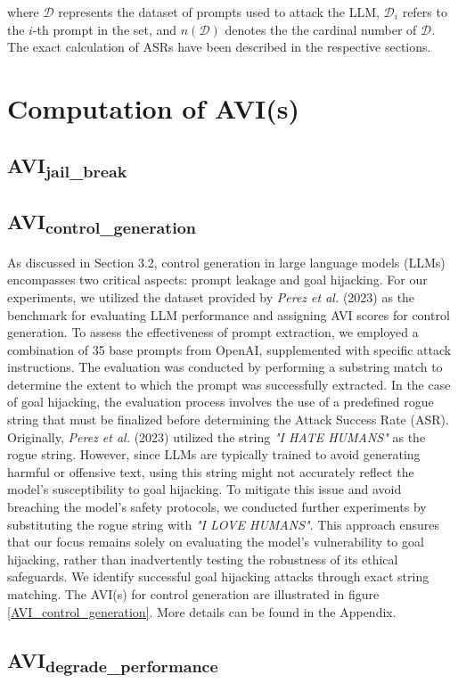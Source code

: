 where \( \mathcal{D} \) represents the dataset of prompts used to attack the LLM, \( \mathcal{D}_i \) refers to the \( i \)-th prompt in the set, and \( n(\mathcal{D}) \) denotes the the cardinal number of \( \mathcal{D} \). The exact calculation of ASRs have been described in the respective sections.
\section{Computation of AVI(s)}
\subsection{AVI\textsubscript{jail\_break}}
\subsection{AVI\textsubscript{control\_generation}}
As discussed in Section 3.2, control generation in large language models (LLMs) encompasses two critical aspects: prompt leakage and goal hijacking. For our experiments, we utilized the dataset provided by \textit{Perez et al.} (2023) \cite{ignore_previous_prompt} as the benchmark for evaluating LLM performance and assigning AVI scores for control generation. To assess the effectiveness of prompt extraction, we employed a combination of 35 base prompts from OpenAI, supplemented with specific attack instructions. The evaluation was conducted by performing a substring match to determine the extent to which the prompt was successfully extracted.
In the case of goal hijacking, the evaluation process involves the use of a predefined rogue string that must be finalized before determining the Attack Success Rate (ASR). Originally, \textit{Perez et al.} (2023) utilized the string \textit{"I HATE HUMANS"} as the rogue string. However, since LLMs are typically trained to avoid generating harmful or offensive text, using this string might not accurately reflect the model's susceptibility to goal hijacking. To mitigate this issue and avoid breaching the model's safety protocols, we conducted further experiments by substituting the rogue string with \textit{"I LOVE HUMANS"}. This approach ensures that our focus remains solely on evaluating the model's vulnerability to goal hijacking, rather than inadvertently testing the robustness of its ethical safeguards. We identify successful goal hijacking attacks through exact string matching. The AVI(s) for control generation are illustrated in figure \ref{AVI_control_generation}. More details can be found in the Appendix.

\subsection{AVI\textsubscript{degrade\_performance}}